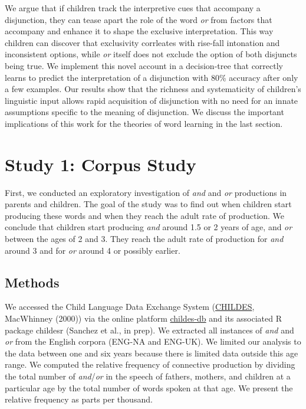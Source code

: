 \documentclass[10pt, letterpaper]{article}
\begin{document}
We argue that if children track the interpretive cues that accompany a
disjunction, they can tease apart the role of the word \emph{or} from
factors that accompany and enhance it to shape the exclusive
interpretation. This way children can discover that exclusivity
corrleates with rise-fall intonation and inconsistent options, while
\emph{or} itself does not exclude the option of both disjuncts being
true. We implement this novel account in a decision-tree that correctly
learns to predict the interpretation of a disjunction with 80\% accuracy
after only a few examples. Our results show that the richness and
systematicity of children's linguistic input allows rapid acquisition of
disjunction with no need for an innate assumptions specific to the
meaning of disjunction. We discuss the important implications of this
work for the theories of word learning in the last section.

\section{Study 1: Corpus Study}\label{study-1-corpus-study}

First, we conducted an exploratory investigation of \emph{and} and
\emph{or} productions in parents and children. The goal of the study was
to find out when children start producing these words and when they
reach the adult rate of production. We conclude that children start
producing \emph{and} around 1.5 or 2 years of age, and \emph{or} between
the ages of 2 and 3. They reach the adult rate of production for
\emph{and} around 3 and for \emph{or} around 4 or possibly earlier.

\subsection{Methods}\label{methods}

We accessed the Child Language Data Exchange System
(\href{https://childes.talkbank.org/}{CHILDES}, MacWhinney (2000)) via
the online platform \href{http://childes-db.stanford.edu/}{childes-db}
and its associated R package childesr (Sanchez et al., in prep). We
extracted all instances of \emph{and} and \emph{or} from the English
corpora (ENG-NA and ENG-UK). We limited our analysis to the data between
one and six years because there is limited data outside this age range.
We computed the relative frequency of connective production by dividing
the total number of \emph{and}/\emph{or} in the speech of fathers,
mothers, and children at a particular age by the total number of words
spoken at that age. We present the relative frequency as parts per
thousand.
\end{document}
